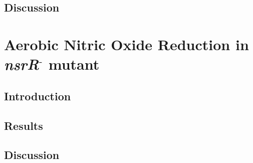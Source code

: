 \subsection{Discussion}
\section{Aerobic Nitric Oxide Reduction in \textit{nsrR$^\textrm{-}$} mutant}
\subsection{Introduction}
\subsection{Results}
\subsection{Discussion}